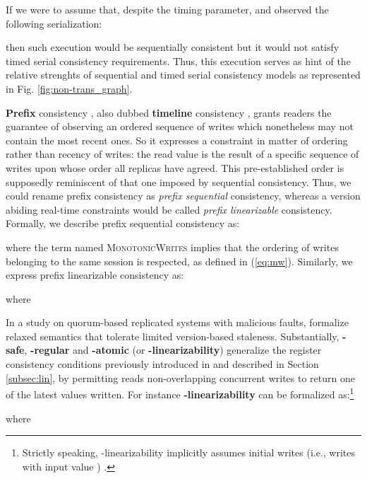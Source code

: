 \documentclass[letter, 11pt]{article}
\newcommand{\citeN}{\citet}
\renewcommand{\cite}{\citep}
\begin{document}
\noindent If we were to assume that, despite the timing parameter,  and  observed the following serialization:

then such execution would be sequentially consistent but it would not satisfy timed serial consistency requirements.
Thus, this execution serves as hint of the relative strenghts of sequential and timed serial consistency models as
represented in Fig. \ref{fig:non-trans_graph}.

\textbf{Prefix} consistency \cite{Terry.ea:95,Terry:13}, 
also dubbed \textbf{timeline} consistency \cite{Cooper.Ramakrishnan.ea:08}, 
grants readers the guarantee of observing an ordered sequence of writes which nonetheless 
may not contain the most recent ones.
So it expresses a constraint in matter of ordering rather than recency of writes: 
the read value is the result of a specific sequence of writes upon whose order all replicas have agreed.
This pre-established order is supposedly reminiscent of that one imposed by sequential consistency. 
Thus, we could rename prefix consistency as \emph{prefix sequential} consistency,
whereas a version abiding real-time constraints would be called \emph{prefix linearizable} consistency. 
Formally, we describe prefix sequential consistency as:

where the term named \textsc{MonotonicWrites} implies that the ordering of writes belonging to the same session is respected, as defined in (\ref{eq:mw}).
Similarly, we express prefix linearizable consistency as:

where






In a study on quorum-based replicated systems with malicious faults, \citeN{Aiyer.ea:05} formalize relaxed semantics 
that tolerate limited version-based staleness.
Substantially, \textbf{-safe}, \textbf{-regular} and \textbf{-atomic} (or \textbf{-linearizability}) generalize 
the register consistency conditions previously introduced in \cite{Lamport:86:vol1}
and described in Section \ref{subsec:lin}, by permitting reads non-overlapping concurrent writes to return one of the latest  values written. For instance \textbf{-linearizability} can be formalized as:\footnote{Strictly speaking, -linearizability implicitly assumes  initial writes (i.e., writes with input value ) \cite{Aiyer.ea:05}.} 

where
\end{document}
